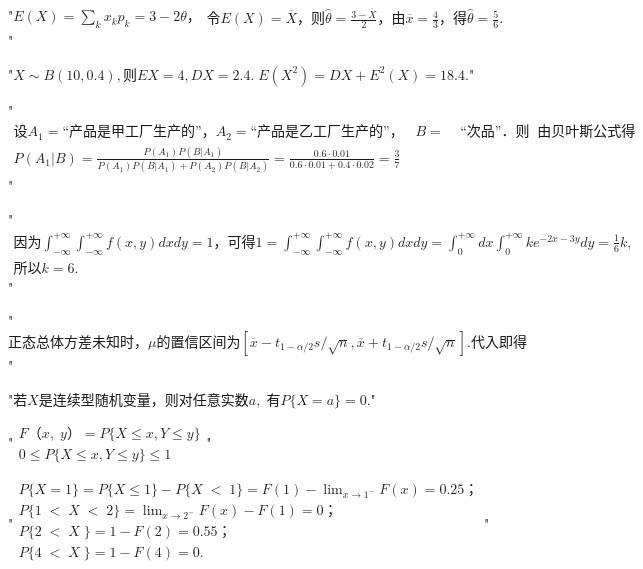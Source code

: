 "$E\left(X\right)=\sum_kx_kp_k=3-2\theta，\begin{array}{l}令E\left(X\right)=\overline X，\mathrm 则\widehat\theta=\frac{3-\overline X}2，由\overline x=\frac43，\mathrm 得\widehat\theta=\frac56.\end{array}$"


"$X\sim B(10,0.4),则EX=4,DX=2.4.\;E(X^2)=DX+E^2(X)=18.4.$"


"$\begin{array}{l}设A_1=“\mathrm{产品是甲工厂生产的}”，A_2=“\mathrm{产品是乙工厂生产的}”，\;\;\;B=\;\;\;\;“\mathrm{次品}”．则\;\;\mathrm{由贝叶斯公式得}\\P(A_1\vert B)=\frac{P(A_1)P(B\vert A_1)}{P(A_1)P(B\vert A_1)+P(A_2)P(B\vert A_2)}=\frac{0.6\cdot0.01}{0.6\cdot0.01+0.4\cdot0.02}=\frac37\end{array}$"


"$\begin{array}{l}\mathrm{因为}\int_{-\infty}^{+\infty}\int_{-\infty}^{+\infty}f(x,y)dxdy=1，\mathrm{可得}1=\int_{-\infty}^{+\infty}\int_{-\infty}^{+\infty}f(x,y)dxdy=\int_0^{+\infty}dx\int_0^{+\infty}ke^{-2x-3y}dy=\frac16k,\\\mathrm{所以}k=6.\end{array}$"


"$\mathrm{正态总体方差未知时}，\mu\mathrm{的置信区间为}\left[\overline x-t_{1-\alpha/2}s/\sqrt n,\overline x+t_{1-\alpha/2}s/\sqrt n\right].\mathrm{代入即得}$"


"$若X\mathrm{是连续型随机变量}，\mathrm{则对任意实数}a,\;有P\{X=a\}=0.$"


"$\begin{array}{l}F（x,\;y）=P\{X\leq x,Y\leq y\}\\0\leq P\{X\leq x,Y\leq y\}\leq1\end{array}$"


"$\begin{array}{l}P\{X=1\}=P\{X\leq1\}-P\{X\;<\;1\}=F(1)-\lim_{x\rightarrow1^-}F(x)=0.25；\\P\{1\;<\;X\;<\;2\}=\lim_{x\rightarrow2^-}F(x)-F(1)=0；\\P\{2\;<\;X\;\}=1-F(2)=0.55；\\P\{4\;<\;X\;\}=1-F(4)=0.\\\end{array}$"


